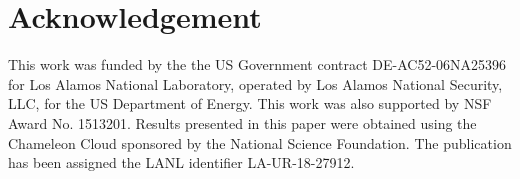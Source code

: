 \section{Acknowledgement}
This work was funded by the the US Government contract DE-AC52-06NA25396 for Los Alamos National Laboratory, operated by Los Alamos National Security,
LLC, for the US Department of Energy. This work was also supported by NSF Award No. 1513201. Results presented in this paper were obtained using the Chameleon Cloud sponsored by the National Science Foundation. The publication has been assigned the LANL identifier LA-UR-18-27912.